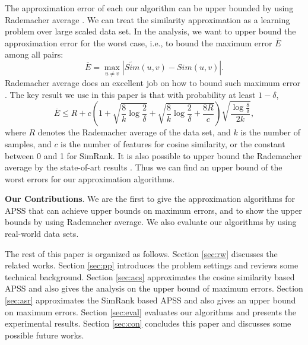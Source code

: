 \documentclass{article}
\begin{document}
The approximation error of each our algorithm can be upper bounded by using Rademacher average \cite{BM02,Mohri09,BBM05}. We can treat the similarity approximation as a learning problem over large scaled data set. In the analysis, we want to upper bound the approximation error for the worst case, i.e., to bound the maximum error $\overline{E}$ among all pairs:
$$\overline{E} = \max_{u\not =v} |\widetilde{Sim}(u,v) - Sim(u,v)|.$$
Rademacher average does an excellent job on how to bound such maximum error \cite{RU15,RU16}. The key result we use in this paper is that with probability at least $1-\delta$,
$$\overline{E} \leq R + c\left(1+\sqrt{\frac{8}{k}\log \frac{2}{\delta}} + \sqrt{\frac{8}{k}\log \frac{2}{\delta} + \frac{8R}{c}}\right)\sqrt{\frac{\log \frac{8}{\delta}}{2k}},$$
where $R$ denotes the Rademacher average of the data set, and $k$ is the number of samples, and $c$ is the number of features for cosine similarity, or the constant between 0 and 1 for SimRank.
It is also possible to upper bound the Rademacher average by the state-of-art results \cite{AGO14,RU15,RU16}. Thus we can find an upper bound of the worst errors for our approximation algorithms.

\textbf{Our Contributions}. We are the first to give the approximation algorithms for APSS that can achieve upper bounds on maximum errors, and to show the upper bounds by using Rademacher average. We also evaluate our algorithms by using real-world data sets.

The rest of this paper is organized as follows. Section \ref{sec:rw} discusses the related works. Section \ref{sec:pp} introduces the problem settings and reviews some technical background. Section \ref{sec:acs} approximates the cosine similarity based APSS and also gives the analysis on the upper bound of maximum errors. Section \ref{sec:asr} approximates the SimRank based APSS and also gives an upper bound on maximum errors. Section \ref{sec:eval} evaluates our algorithms and presents the experimental results. Section \ref{sec:con} concludes this paper and discusses some possible future works.
\end{document}
